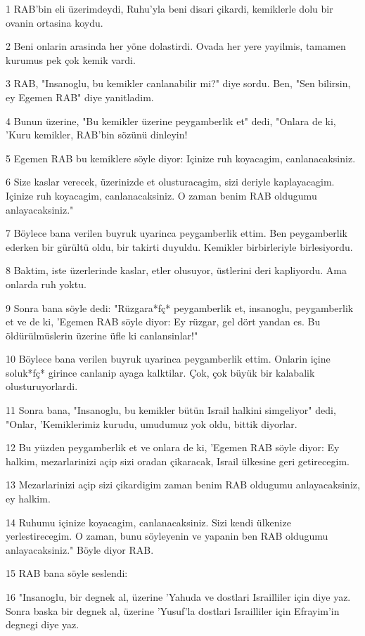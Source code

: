 \par 1 RAB'bin eli üzerimdeydi, Ruhu'yla beni disari çikardi, kemiklerle dolu bir ovanin ortasina koydu.
\par 2 Beni onlarin arasinda her yöne dolastirdi. Ovada her yere yayilmis, tamamen kurumus pek çok kemik vardi.
\par 3 RAB, "Insanoglu, bu kemikler canlanabilir mi?" diye sordu. Ben, "Sen bilirsin, ey Egemen RAB" diye yanitladim.
\par 4 Bunun üzerine, "Bu kemikler üzerine peygamberlik et" dedi, "Onlara de ki, 'Kuru kemikler, RAB'bin sözünü dinleyin!
\par 5 Egemen RAB bu kemiklere söyle diyor: Içinize ruh koyacagim, canlanacaksiniz.
\par 6 Size kaslar verecek, üzerinizde et olusturacagim, sizi deriyle kaplayacagim. Içinize ruh koyacagim, canlanacaksiniz. O zaman benim RAB oldugumu anlayacaksiniz."
\par 7 Böylece bana verilen buyruk uyarinca peygamberlik ettim. Ben peygamberlik ederken bir gürültü oldu, bir takirti duyuldu. Kemikler birbirleriyle birlesiyordu.
\par 8 Baktim, iste üzerlerinde kaslar, etler olusuyor, üstlerini deri kapliyordu. Ama onlarda ruh yoktu.
\par 9 Sonra bana söyle dedi: "Rüzgara*fç* peygamberlik et, insanoglu, peygamberlik et ve de ki, 'Egemen RAB söyle diyor: Ey rüzgar, gel dört yandan es. Bu öldürülmüslerin üzerine üfle ki canlansinlar!"
\par 10 Böylece bana verilen buyruk uyarinca peygamberlik ettim. Onlarin içine soluk*fç* girince canlanip ayaga kalktilar. Çok, çok büyük bir kalabalik olusturuyorlardi.
\par 11 Sonra bana, "Insanoglu, bu kemikler bütün Israil halkini simgeliyor" dedi, "Onlar, 'Kemiklerimiz kurudu, umudumuz yok oldu, bittik diyorlar.
\par 12 Bu yüzden peygamberlik et ve onlara de ki, 'Egemen RAB söyle diyor: Ey halkim, mezarlarinizi açip sizi oradan çikaracak, Israil ülkesine geri getirecegim.
\par 13 Mezarlarinizi açip sizi çikardigim zaman benim RAB oldugumu anlayacaksiniz, ey halkim.
\par 14 Ruhumu içinize koyacagim, canlanacaksiniz. Sizi kendi ülkenize yerlestirecegim. O zaman, bunu söyleyenin ve yapanin ben RAB oldugumu anlayacaksiniz." Böyle diyor RAB.
\par 15 RAB bana söyle seslendi:
\par 16 "Insanoglu, bir degnek al, üzerine 'Yahuda ve dostlari Israilliler için diye yaz. Sonra baska bir degnek al, üzerine 'Yusuf'la dostlari Israilliler için Efrayim'in degnegi diye yaz.
